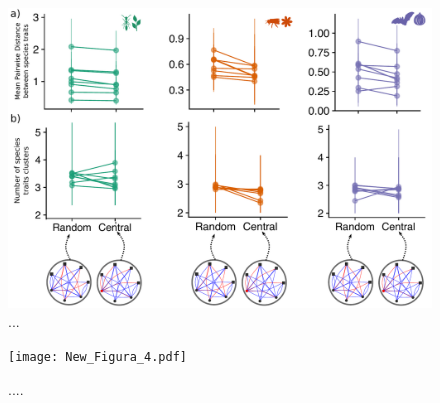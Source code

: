 \documentclass[a4paper, 12pt]{article}
\begin{document}
\begin{singlespace}
\begin{figure}[H]
  \includegraphics[width=\linewidth]{New_Figura_3.pdf}
  \vspace*{-7mm}
  \caption{...}
  \label{fig:3}
\end{figure}

\begin{figure}[H]
  \texttt{[image: New\_Figura\_4.pdf]}
  \vspace*{-7mm}
  \caption{....}
  \label{fig:4}
\end{figure}
\end{singlespace}
\end{document}
